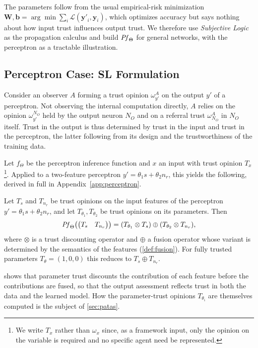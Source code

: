 The parameters follow from the usual empirical-risk minimization \(\mathbf{W},\mathbf{b} = \arg\min \sum_i \mathcal{L}(\mathbf{y\prime}_i,\mathbf{y}_i)\), which optimizes accuracy but says nothing about how input trust influences output trust. We therefore use \emph{Subjective Logic} as the propagation calculus and build \(\mathit{Pf}_\Theta\) for general networks, with the perceptron as a tractable illustration.
 
\vspace{-0.5em}
\subsection{Perceptron Case: SL Formulation}\label{sec:perceptron}

Consider an observer \(A\) forming a trust opinion \(\omega_{y\prime}^A\) on the output \(y\prime\) of a perceptron. Not observing the internal computation directly, \(A\) relies on the opinion \(\omega_{y\prime}^{N_O}\) held by the output neuron \(N_O\) and on a referral trust \(\omega_{N_O}^A\) in \(N_O\) itself. Trust in the output is thus determined by trust in the input and trust in the perceptron, the latter following from its design and the trustworthiness of the training data.

Let \( f_\Theta \) be the perceptron inference function and \( x \) an input with trust opinion \( T_x \)\footnote{We write \(T_x\) rather than \(\omega_x\) since, as a framework input, only the opinion on the variable is required and no specific agent need be represented.}. Applied to a two-feature perceptron \(y\prime = \theta_1 s + \theta_2 n_r\), this yields the following, derived in full in Appendix~\ref{app:perceptron}.

\begin{lemma}\label{lem:perceptron}
Let \(T_s\) and \(T_{n_r}\) be trust opinions on the input features of the perceptron \(y\prime = \theta_1 s + \theta_2 n_r\), and let \(T_{\theta_1}, T_{\theta_2}\) be trust opinions on its parameters. Then
\begin{equation}
\label{eq:sol}
    \mathit{Pf}_\Theta\!\left(\begin{pmatrix} T_s & T_{n_r}\end{pmatrix}\right) =  (T_{\theta_1}\otimes T_s)\oplus (T_{\theta_2}\otimes T_{n_r}),
\end{equation}
where \(\otimes\) is a trust discounting operator and \(\oplus\) a fusion operator whose variant is determined by the semantics of the features (\cref{def:fusion}). For fully trusted parameters \(T_\theta = (1,0,0)\) this reduces to \(T_s \oplus T_{n_r}\).
\end{lemma}

 shows that parameter trust discounts the contribution of each feature before the contributions are fused, so that the output assessment reflects trust in both the data and the learned model. How the parameter-trust opinions \(T_{\theta_i}\) are themselves computed is the subject of \cref{sec:patas}.
